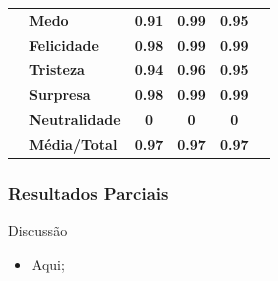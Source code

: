 \documentclass{beamer}
\begin{document}
\begin{frame}
\begin{table}[]
\begin{tabular}{llcccc}
                                       & \textbf{Medo}         & \textbf{0.91}                         & \textbf{0.99}                          & \textbf{0.95}                         &                                       \\
                                       & \textbf{Felicidade}   & \textbf{0.98}                         & \textbf{0.99}                          & \textbf{0.99}                         &                                       \\
                                       & \textbf{Tristeza}     & \textbf{0.94}                         & \textbf{0.96}                          & \textbf{0.95}                         &                                       \\
                                       & \textbf{Surpresa}     & \textbf{0.98}                         & \textbf{0.99}                          & \textbf{0.99}                         &                                       \\
                                       & \textbf{Neutralidade} & \textbf{0}                            & \textbf{0}                             & \textbf{0}                            &                                       \\
                                       & \textbf{Média/Total}  & \textbf{0.97}                         & \textbf{0.97}                          & \textbf{0.97}                         &                                       \\ \hline
\end{tabular}
\end{table} 
 
\end{frame}


\begin{frame}
\frametitle{Resultados Parciais}
 \begin{block}{Discussão}
\begin{itemize}
\pause
\item Aqui;

\end{itemize}
\end{block}
\end{frame}
\end{document}
